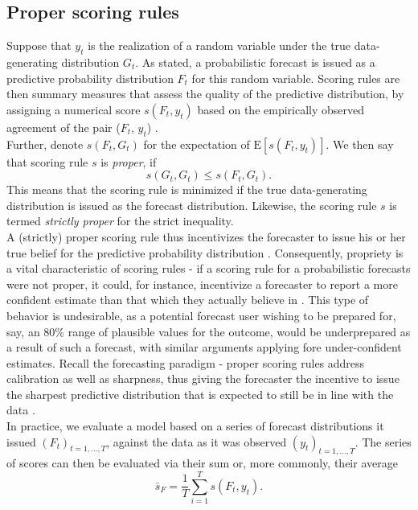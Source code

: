 \subsection{Proper scoring rules}
Suppose that $y_t$ is the realization of a random variable under the true data-generating distribution $G_t$. As stated, a probabilistic forecast is issued as a predictive probability distribution $F_t$ for this random variable. Scoring rules are then summary measures that assess the quality of the predictive distribution, by assigning a numerical score $s(F_t, y_t)$ based on the empirically observed agreement of the pair ($F_t$, $y_t$) \citep{gneiting_strictly_2007}.\\ Further, denote $s(F_t,G_t)$ for the expectation of $\text{E}[s(F_t,y_t)]$. We then say that scoring rule $s$ is \textit{proper}, if 
\[s(G_t,G_t) \leq s(F_t,G_t).\]
This means that the scoring rule is minimized if the true data-generating distribution is issued as the forecast distribution. Likewise, the scoring rule $s$ is termed \textit{strictly proper} for the strict inequality.\\
A (strictly) proper scoring rule thus incentivizes the forecaster to issue his or her true belief for the predictive probability distribution  \citep{gneiting_strictly_2007}. Consequently, propriety is a vital characteristic of scoring rules - if a scoring rule for a probabilistic forecasts were not proper, it could, for instance, incentivize a forecaster to report a more confident estimate than that which they actually believe in \citep{thorarinsdottir_using_2013}. This type of behavior is undesirable, as a potential forecast user wishing to be prepared for, say, an $80\%$ range of plausible values for the outcome, would be underprepared as a result of such a forecast, with similar arguments applying fore under-confident estimates. Recall the forecasting paradigm - proper scoring rules address calibration as well as sharpness, thus giving the forecaster the incentive to issue the sharpest predictive distribution that is expected to still be in line with the data \citep{gneiting_probabilistic_2007}.\\
In practice, we evaluate a model based on a series of forecast distributions it issued $(F_t)_{t=1,...,T}$, against the data as it was observed $(y_t)_{t=1,...,T}$. The series of scores can then be evaluated via their sum or, more commonly, their average
\begin{equation*}
\bar{s}_F = \frac{1}{T}\sum_{i = 1}^{T} s(F_t, y_t).
\end{equation*}
